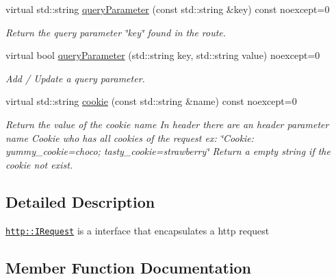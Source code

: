 \begin{DoxyCompactItemize}
virtual std\+::string \hyperlink{structhttp_1_1IRequest_ae6177a18241aff420fa2e6f93195a7a7}{query\+Parameter} (const std\+::string \&key) const noexcept=0
\begin{DoxyCompactList}\small\item\em Return the query parameter \char`\"{}key\char`\"{} found in the route. \end{DoxyCompactList}\item 
virtual bool \hyperlink{structhttp_1_1IRequest_aded13d22f58bf5f622524929a52de7ef}{query\+Parameter} (std\+::string key, std\+::string value) noexcept=0
\begin{DoxyCompactList}\small\item\em Add / Update a query parameter. \end{DoxyCompactList}\item 
\mbox{\label{structhttp_1_1IRequest_adf6b9c910c1b2ad11ac9fec2f216b16e}} 
virtual std\+::string \hyperlink{structhttp_1_1IRequest_adf6b9c910c1b2ad11ac9fec2f216b16e}{cookie} (const std\+::string \&name) const noexcept=0
\begin{DoxyCompactList}\small\item\em Return the value of the cookie \textquotesingle{}name\textquotesingle{} In header there are an header parameter name \textquotesingle{}Cookie\textquotesingle{} who has all cookies of the request ex\+: \char`\"{}\+Cookie\+: yummy\+\_\+cookie=choco; tasty\+\_\+cookie=strawberry\char`\"{} Return a empty string if the cookie not exist. \end{DoxyCompactList}\end{DoxyCompactItemize}


\subsection{Detailed Description}
\href{http::IRequest}{\tt http\+::\+I\+Request} is a interface that encapsulates a http request 

\subsection{Member Function Documentation}
\mbox{\label{structhttp_1_1IRequest_ae6177a18241aff420fa2e6f93195a7a7}} 
